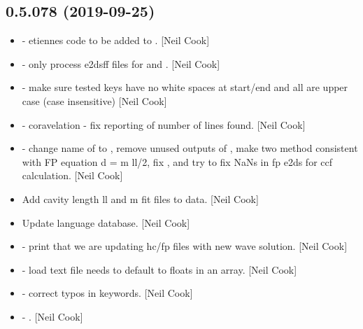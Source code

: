 \documentclass[a4paper,10pt,english]{report}
\begin{document}
\subsection{0.5.078 (2019-09-25)}
\label{\detokenize{misc/changelog:id65}}\begin{itemize}
\item {} 
 - etiennes code to be added to .
{[}Neil Cook{]}

\item {} 
 - only process e2dsff files for  and
. {[}Neil Cook{]}

\item {} 
 - make sure tested keys have no white spaces at
start/end and all are upper case (case insensitive) {[}Neil Cook{]}

\item {} 
 - coravelation - fix reporting of number
of lines found. {[}Neil Cook{]}

\item {} 
 - change name of  to
, remove unused outputs of ,
make two method consistent with FP equation d = m \sphinxtitleref{*} ll/2, fix
, and try to fix NaNs in fp e2ds for ccf
calculation. {[}Neil Cook{]}

\item {} 
Add cavity length ll and m fit files to data. {[}Neil Cook{]}

\item {} 
Update language database. {[}Neil Cook{]}

\item {} 
 - print that we are updating hc/fp
files with new wave solution. {[}Neil Cook{]}

\item {} 
 - load text file needs to default to floats in an
array. {[}Neil Cook{]}

\item {} 
 - correct typos in
keywords. {[}Neil Cook{]}

\item {} 
 - .
{[}Neil Cook{]}

\end{itemize}
\end{document}
